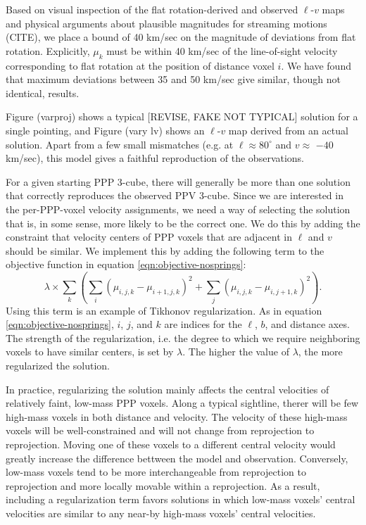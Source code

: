 Based on visual inspection of the flat rotation-derived and observed $\ell$-$v$ maps and physical arguments about plausible magnitudes for streaming motions (CITE), we place a bound of 40 km/sec on the magnitude of deviations from flat rotation. Explicitly, $\mu_k$ must be within 40 km/sec of the line-of-sight velocity corresponding to flat rotation at the position of distance voxel $i$. We have found that maximum deviations between 35 and 50 km/sec give similar, though not identical, results.

Figure (varproj) shows a typical [REVISE, FAKE NOT TYPICAL] solution for a single pointing, and Figure (vary lv) shows an $\ell$-$v$ map derived from an actual solution. Apart from a few small mismatches (e.g. at $\ell \approx 80^\circ$ and $v\approx$ $-40$ km/sec), this model gives a faithful reproduction of the observations.

For a given starting PPP 3-cube, there will generally be more than one solution that correctly reproduces the observed PPV 3-cube. Since we are interested in the per-PPP-voxel velocity assignments, we need a way of selecting the solution that is, in some sense, more likely to be the correct one. We do this by adding the constraint that velocity centers of PPP voxels that are adjacent in $\ell$ and $v$ should be similar. We implement this by adding the following term to the objective function in equation \ref{eqn:objective-nosprings}:
\begin{equation}
    \lambda \times \sum_k \left( \sum_i (\mu_{i,j,k} - \mu_{i+1,j,k})^2 + 
    \sum_j (\mu_{i,j,k} - \mu_{i,j+1,k})^2 \right).
\end{equation}
Using this term is an example of Tikhonov regularization. As in equation \ref{eqn:objective-nosprings}, $i$, $j$, and $k$ are indices for the $\ell$, $b$, and distance axes. The strength of the regularization, i.e. the degree to which we require neighboring voxels to have similar centers, is set by $\lambda$. The higher the value of $\lambda$, the more regularized the solution.

In practice, regularizing the solution mainly affects the central velocities of relatively faint, low-mass PPP voxels. Along a typical sightline, therer will be few high-mass voxels in both distance and velocity. The velocity of these high-mass voxels will be well-constrained and will not change from reprojection to reprojection. Moving one of these voxels to a different central velocity would greatly increase the difference bettween the model and observation. Conversely, low-mass voxels tend to be more interchangeable from reprojection to reprojection and more locally movable within a reprojection. As a result, including a regularization term favors solutions in which low-mass voxels' central velocities are similar to any near-by high-mass voxels' central velocities.

